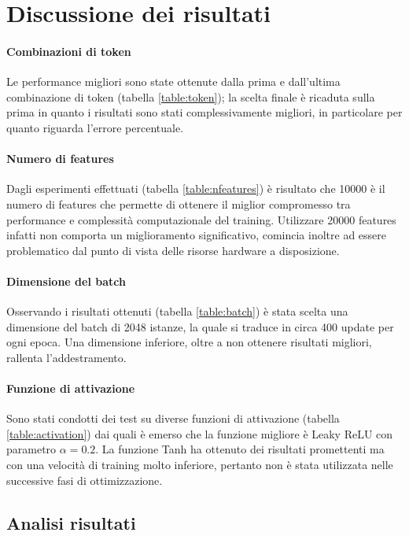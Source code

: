 \section{Discussione dei risultati}

\paragraph{Combinazioni di token} Le performance migliori sono state ottenute dalla prima e 
dall'ultima combinazione di token (tabella \ref{table:token}); la scelta finale è ricaduta 
sulla prima in quanto i risultati sono stati complessivamente migliori, in particolare per 
quanto riguarda l'errore percentuale.

\paragraph{Numero di features} Dagli esperimenti effettuati (tabella \ref{table:nfeatures}) è risultato che 10000 è il numero di 
features che permette di ottenere il miglior compromesso tra performance e complessità 
computazionale del training. Utilizzare 20000 features infatti non comporta un miglioramento 
significativo, comincia inoltre ad essere problematico dal punto di vista delle risorse
 hardware a disposizione.

\paragraph{Dimensione del batch} Osservando i risultati ottenuti (tabella \ref{table:batch}) è stata scelta una 
dimensione del batch di 2048 istanze, la quale si traduce in circa 400 update per ogni 
epoca. Una dimensione inferiore, oltre a non ottenere risultati migliori, rallenta l'addestramento.

\paragraph{Funzione di attivazione} Sono stati condotti dei test su diverse funzioni di 
attivazione (tabella \ref{table:activation}) dai quali è emerso che la funzione migliore è Leaky ReLU con 
parametro $\alpha = 0.2$. La funzione Tanh ha ottenuto dei risultati promettenti ma con 
una velocità di training molto inferiore, pertanto non è stata utilizzata nelle successive
 fasi di ottimizzazione.

\subsection{Analisi risultati}
